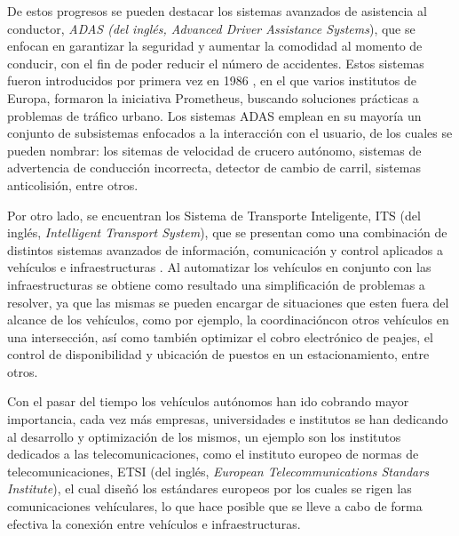 \par De estos progresos se pueden destacar los sistemas avanzados de asistencia al conductor, \textit{ADAS (del inglés, Advanced Driver Assistance Systems}), que se enfocan en garantizar la seguridad y aumentar la comodidad al momento de conducir, con el fin de poder reducir el número de accidentes. Estos sistemas fueron introducidos por primera vez en 1986 \cite{ADAS}, en el que varios institutos de Europa, formaron la iniciativa Prometheus, buscando soluciones prácticas a problemas de tráfico urbano. Los sistemas ADAS emplean en su mayoría un conjunto de subsistemas enfocados a la interacción con el usuario, de los cuales se pueden nombrar: los sitemas de velocidad de crucero autónomo, sistemas de advertencia de conducción incorrecta, detector de cambio de carril, sistemas anticolisión, entre otros.\\ 

\par Por otro lado, se encuentran los Sistema de Transporte Inteligente, ITS (del inglés, \textit{Intelligent Transport System}), que se presentan como una combinación de distintos sistemas avanzados de información, comunicación y control aplicados a vehículos e infraestructuras \cite{rastelli2012agentes}. Al automatizar los vehículos en conjunto con las infraestructuras se obtiene como resultado una simplificación de problemas a resolver, ya que las mismas se pueden encargar de situaciones que esten fuera del alcance de los vehículos, como por ejemplo, la coordinacióncon otros vehículos en una intersección, así como también optimizar el cobro electrónico de peajes, el control de disponibilidad y ubicación de puestos en un estacionamiento, entre otros.\\  
  
\par Con el pasar del tiempo los vehículos autónomos han ido cobrando mayor importancia, cada vez más empresas, universidades e institutos se han dedicando al desarrollo y optimización de los mismos, un ejemplo son los institutos dedicados a las telecomunicaciones, como el instituto europeo de normas de telecomunicaciones, ETSI (del inglés,\textit{ European Telecommunications Standars Institute}), el cual diseñó los estándares europeos por los cuales se rigen las comunicaciones vehículares, lo que hace posible que se lleve a cabo de forma efectiva la conexión entre vehículos e infraestructuras.\\    

